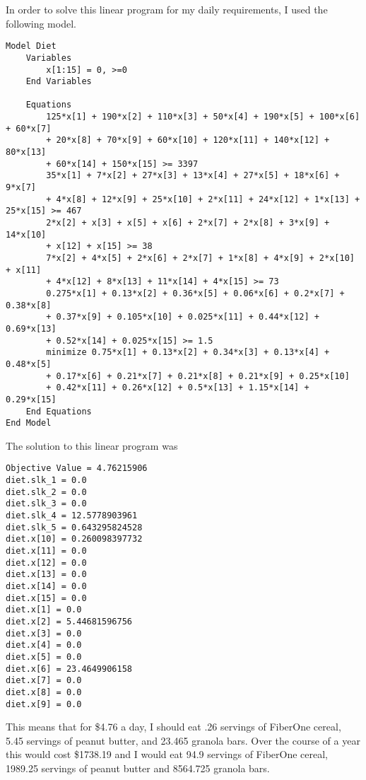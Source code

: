 \documentclass[11pt, oneside]{article}
\begin{document}
In order to solve this linear program for my daily requirements, I used the
following model.
\begin{verbatim}
Model Diet
    Variables
        x[1:15] = 0, >=0
    End Variables

    Equations
        125*x[1] + 190*x[2] + 110*x[3] + 50*x[4] + 190*x[5] + 100*x[6] + 60*x[7]
        + 20*x[8] + 70*x[9] + 60*x[10] + 120*x[11] + 140*x[12] + 80*x[13]
        + 60*x[14] + 150*x[15] >= 3397
        35*x[1] + 7*x[2] + 27*x[3] + 13*x[4] + 27*x[5] + 18*x[6] + 9*x[7]
        + 4*x[8] + 12*x[9] + 25*x[10] + 2*x[11] + 24*x[12] + 1*x[13] + 25*x[15] >= 467
        2*x[2] + x[3] + x[5] + x[6] + 2*x[7] + 2*x[8] + 3*x[9] + 14*x[10]
        + x[12] + x[15] >= 38
        7*x[2] + 4*x[5] + 2*x[6] + 2*x[7] + 1*x[8] + 4*x[9] + 2*x[10] + x[11]
        + 4*x[12] + 8*x[13] + 11*x[14] + 4*x[15] >= 73
        0.275*x[1] + 0.13*x[2] + 0.36*x[5] + 0.06*x[6] + 0.2*x[7] + 0.38*x[8]
        + 0.37*x[9] + 0.105*x[10] + 0.025*x[11] + 0.44*x[12] + 0.69*x[13]
        + 0.52*x[14] + 0.025*x[15] >= 1.5
        minimize 0.75*x[1] + 0.13*x[2] + 0.34*x[3] + 0.13*x[4] + 0.48*x[5]
        + 0.17*x[6] + 0.21*x[7] + 0.21*x[8] + 0.21*x[9] + 0.25*x[10]
        + 0.42*x[11] + 0.26*x[12] + 0.5*x[13] + 1.15*x[14] + 0.29*x[15]
    End Equations
End Model
\end{verbatim}

The solution to this linear program was
\begin{verbatim}
Objective Value = 4.76215906
diet.slk_1 = 0.0
diet.slk_2 = 0.0
diet.slk_3 = 0.0
diet.slk_4 = 12.5778903961
diet.slk_5 = 0.643295824528
diet.x[10] = 0.260098397732
diet.x[11] = 0.0
diet.x[12] = 0.0
diet.x[13] = 0.0
diet.x[14] = 0.0
diet.x[15] = 0.0
diet.x[1] = 0.0
diet.x[2] = 5.44681596756
diet.x[3] = 0.0
diet.x[4] = 0.0
diet.x[5] = 0.0
diet.x[6] = 23.4649906158
diet.x[7] = 0.0
diet.x[8] = 0.0
diet.x[9] = 0.0
\end{verbatim}

This means that for \$4.76 a day, I should eat .26 servings of FiberOne cereal,
5.45 servings of peanut butter, and 23.465 granola bars.
Over the course of a year this would cost \$1738.19 and I would eat 94.9
servings of FiberOne cereal, 1989.25 servings of peanut butter and 8564.725
granola bars.
\end{document}

